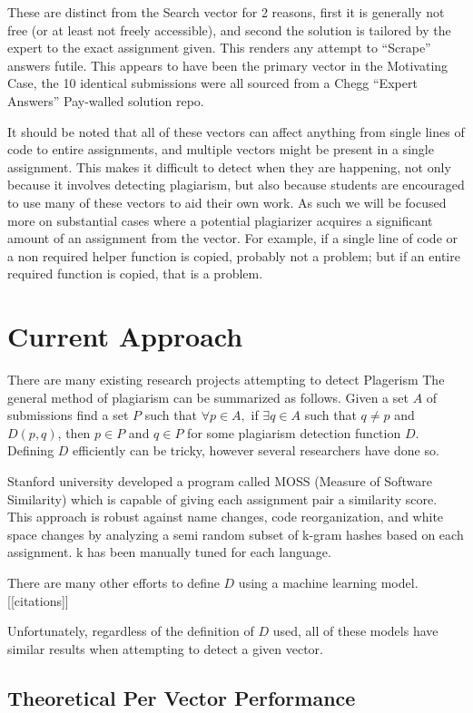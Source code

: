 \documentclass[letterpaper,10pt,conference]{IEEEtran}
\begin{document}
\begin{itemize}
\begin{itemize}
	
	\end{itemize} These are distinct from the Search vector for 2 reasons, first it is generally not free (or at least not freely accessible), and second the solution is tailored by the expert to the exact assignment given.  This renders any attempt to ``Scrape'' answers futile.
	This appears to have been the primary vector in the Motivating Case, the 10 identical submissions were all sourced from a Chegg ``Expert Answers'' Pay-walled solution repo.
\end{itemize}
 It should be noted that all of these vectors can affect anything from single lines of code to entire assignments, and multiple vectors might be present in a single assignment.
	This makes it difficult to detect when they are happening, not only because it involves detecting plagiarism, but also because students are encouraged to use many of these vectors to aid their own work.  As such we will be focused more on substantial cases where a potential plagiarizer acquires a significant amount of an assignment from the vector.  For example, if a single line of code or a non required helper function is copied, probably not a problem; but if an entire required function is copied, that is a problem.
\section{Current Approach}
There are many existing research projects attempting to detect Plagerism The general method of plagiarism can be summarized as follows.  Given a set $A$ of submissions find a set $P$ such that  $\forall p\in A,$ if $\exists q\in A$ such that $q\not=p$ and $D(p,q)$, then $p\in P$ and $q\in P$ for some plagiarism detection function $D$.  Defining $D$ efficiently can be tricky, however several researchers have done so.
	
		Stanford university developed a program called MOSS (Measure of Software Similarity) which is capable of giving each assignment pair a similarity score. This approach is robust against name changes, code reorganization, and white space changes by analyzing a semi random subset of k-gram hashes based on each assignment.  k has been manually tuned for each language.\cite{moss}
	
	
	There are many other efforts to define $D$ using a machine learning model.[[citations]]
	
	Unfortunately, regardless of the definition of $D$ used, all of these models have similar results when attempting to detect a given vector.
\subsection{Theoretical Per Vector Performance}
\end{document}
